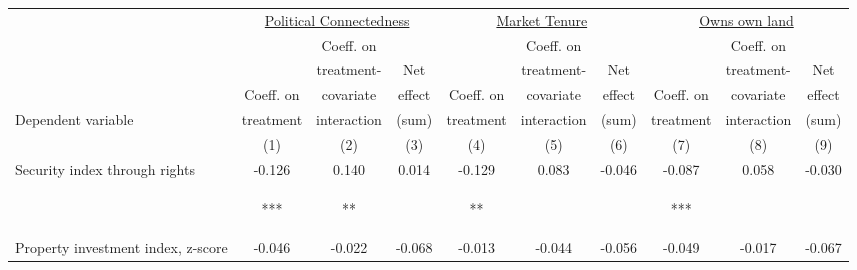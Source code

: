 \begin{tabular}{lccccccccc}
\hline \noalign{\smallskip} & \multicolumn{3}{c}{\uline{\hfill Political Connectedness \hfill}} & \multicolumn{3}{c}{\uline{\hfill Market Tenure \hfill}} & \multicolumn{3}{c}{\uline{\hfill Owns own land \hfill}}\\
 &  & Coeff. on &  &  & Coeff. on &  &  & Coeff. on & \\
 &  & treatment- & Net &  & treatment- & Net &  & treatment- & Net\\
 & Coeff. on & covariate & effect & Coeff. on & covariate & effect & Coeff. on & covariate & effect\\
Dependent variable & treatment & interaction & (sum) & treatment & interaction & (sum) & treatment & interaction & (sum)\\
 & (1) & (2) & (3) & (4) & (5) & (6) & (7) & (8) & (9)\\
\noalign{\smallskip}\hline \noalign{\smallskip}Security index through rights & -0.126 & 0.140 & 0.014 & -0.129 & 0.083 & -0.046 & -0.087 & 0.058 & -0.030\\
 & \begin{footnotesize}[0.037]***\end{footnotesize} & \begin{footnotesize}[0.058]**\end{footnotesize} & \begin{footnotesize}[0.047]\end{footnotesize} & \begin{footnotesize}[0.063]**\end{footnotesize} & \begin{footnotesize}[0.067]\end{footnotesize} & \begin{footnotesize}[0.031]\end{footnotesize} & \begin{footnotesize}[0.031]***\end{footnotesize} & \begin{footnotesize}[0.076]\end{footnotesize} & \begin{footnotesize}[0.072]\end{footnotesize}\\
\noalign{\smallskip}Property investment index, z-score & -0.046 & -0.022 & -0.068 & -0.013 & -0.044 & -0.056 & -0.049 & -0.017 & -0.067\\

\end{tabular}
